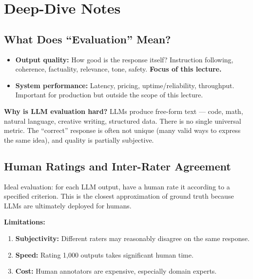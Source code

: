 \documentclass[11pt, a4paper]{article}
\begin{document}
\newpage
\section{Deep-Dive Notes}

\subsection{What Does ``Evaluation'' Mean?}

\begin{defbox}
\begin{itemize}[leftmargin=1.5em]
  \item \textbf{Output quality:} How good is the response itself? Instruction following, coherence, factuality, relevance, tone, safety. \textbf{Focus of this lecture.}
  \item \textbf{System performance:} Latency, pricing, uptime/reliability, throughput. Important for production but outside the scope of this lecture.
\end{itemize}
\end{defbox}

\textbf{Why is LLM evaluation hard?} LLMs produce free-form text --- code, math, natural language, creative writing, structured data. There is no single universal metric. The ``correct'' response is often not unique (many valid ways to express the same idea), and quality is partially subjective.

\subsection{Human Ratings and Inter-Rater Agreement}

\begin{defbox}
Ideal evaluation: for each LLM output, have a human rate it according to a specified criterion. This is the closest approximation of ground truth because LLMs are ultimately deployed for humans.

\textbf{Limitations:}
\begin{enumerate}[leftmargin=1.5em]
  \item \textbf{Subjectivity:} Different raters may reasonably disagree on the same response.
  \item \textbf{Speed:} Rating 1,000 outputs takes significant human time.
  \item \textbf{Cost:} Human annotators are expensive, especially domain experts.
\end{enumerate}
\end{defbox}
\end{document}
